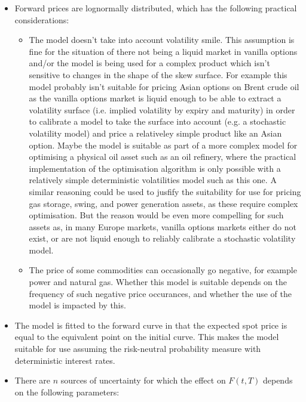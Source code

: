 \documentclass{article}
\begin{document}
\begin{itemize}
    \item Forward prices are lognormally distributed, which has the following practical
    considerations: 
    \begin{itemize}
        \item The model doesn't take into account volatility smile. This assumption is
        fine for the situation of there not being a liquid market in vanilla 
        options and/or the model is being used for a complex product which isn't sensitive
        to changes in the shape of the skew surface. For example this model probably isn't
        suitable for pricing Asian options on Brent crude oil as the vanilla options market
        is liquid enough to be able to extract a volatility surface (i.e. implied volatility
        by expiry and maturity) in order to calibrate a model to take the surface into account
        (e.g. a stochastic volatility model) and price a relativeley simple product like an 
        Asian option. Maybe the model is suitable as part of a more complex model for 
        optimising a physical oil asset such as an oil refinery, where the 
        practical implementation of the optimisation algorithm is only possible with a relatively
        simple deterministic volatilities model such as this one. A similar reasoning
        could be used to jusfify the suitability for use for pricing gas storage, swing, and
        power generation assets, as these require complex optimisation. But the reason would
        be even more compelling for such assets as, in many Europe markets, vanilla options
        markets either do not exist, or are not liquid enough to reliably calibrate a
        stochastic volatility model.
        \item The price of some commodities can occasionally go negative, for example
        power and natural gas. Whether this model is suitable depends on the frequency
        of such negative price occurances, and whether the use of the model is impacted
        by this.
    \end{itemize}
    \item The model is fitted to the forward curve in that the expected spot price 
    is equal to the equivalent point on the initial curve. This makes the model suitable
    for use assuming the risk-neutral probability measure with deterministic interest
    rates.
    \item There are $n$ sources of uncertainty for which the effect on $F(t, T)$
    depends on the following parameters:

\end{itemize}
\end{document}
